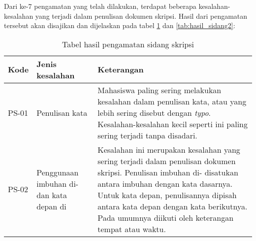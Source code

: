 Dari ke-7 pengamatan yang telah dilakukan, terdapat beberapa kesalahan-kesalahan yang terjadi dalam penulisan dokumen skripsi. Hasil dari pengamatan tersebut akan disajikan dan dijelaskan pada tabel \ref{tab:hasil_sidang1} dan \ref{tab:hasil_sidang2}:

\begin{table}[H]
	\caption {Tabel hasil pengamatan sidang skripsi} \label{tab:hasil_sidang1}
	\begin{center}
		\begin{tabular}{|p{1.5 cm}|>{\raggedright} p{5.5 cm}| p{7.5 cm}|}
		\hline
		Kode & Jenis kesalahan & Keterangan \\ 
		\hline
		PS-01 & Penulisan kata & Mahasiswa paling sering melakukan kesalahan dalam penulisan kata, atau yang lebih sering disebut dengan \textit{typo}. Kesalahan-kesalahan kecil seperti ini paling sering terjadi tanpa disadari. \newline \\ 
		\hline 
		PS-02 & Penggunaan imbuhan di- dan kata depan di & Kesalahan ini merupakan kesalahan yang sering terjadi dalam penulisan dokumen skripsi. Penulisan imbuhan di- disatukan antara imbuhan dengan kata dasarnya. Untuk kata depan, penulisannya dipisah antara kata depan dengan kata berikutnya. Pada umumnya diikuti oleh keterangan tempat atau waktu. \newline \\ 
		\hline 
		\end{tabular}
	\end{center}
\end{table}

